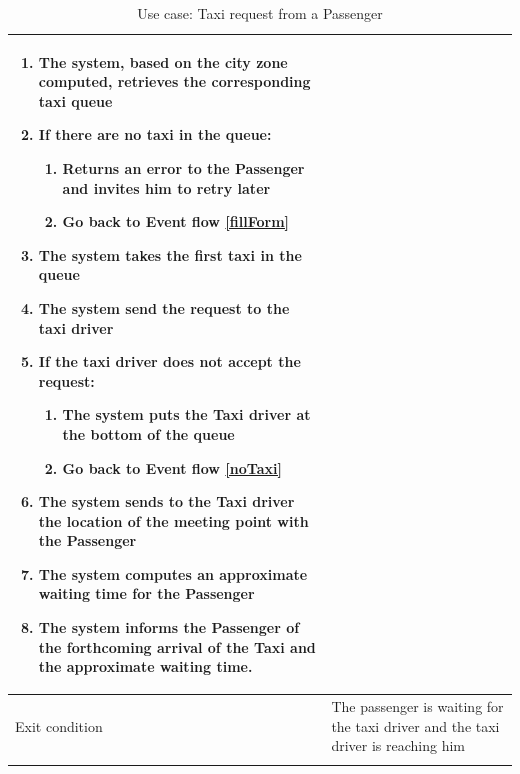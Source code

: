 \begin{center}
\begin{longtable}{| p{} | p{} |}
\begin{enumerate}
				\item The system, based on the city zone computed, retrieves the corresponding taxi queue
				\item If there are no taxi in the queue: \label{noTaxi}
				\begin{enumerate}
					\item Returns an error to the Passenger and invites him to retry later
					\item Go back to Event flow \ref{fillForm}
				\end{enumerate}
				\item The system takes the first taxi in the queue
				\item The system send the request to the taxi driver
				\item If the taxi driver does not accept the request:
				\begin{enumerate}
					\item The system puts the Taxi driver at the bottom of the queue
					\item Go back to Event flow \ref{noTaxi}
				\end{enumerate}
				\item The system sends to the Taxi driver the location of the meeting point with the Passenger
				\item The system computes an approximate waiting time for the Passenger
				\item The system informs the Passenger of the forthcoming arrival of the Taxi and the approximate waiting time.
			\end{enumerate} \\ \hline
Exit condition & The passenger is waiting for the taxi driver and the taxi driver is reaching him
\\ \hline
\caption{Use case: Taxi request from a Passenger}
\label{requestTaxiUC}
\end{longtable}

\end{center}
